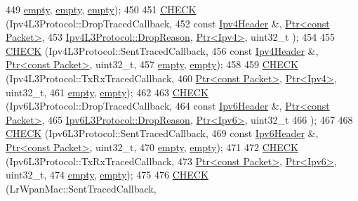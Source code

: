 \begin{DoxyCode}
449          \hyperlink{classns3_1_1empty}{empty}, \hyperlink{classns3_1_1empty}{empty}, \hyperlink{classns3_1_1empty}{empty});
450 
451   \hyperlink{traced-callback-typedef-test-suite_8cc_aa79806eee113005f96d9d3cb1480ce98}{CHECK} (Ipv4L3Protocol::DropTracedCallback,
452          \textcolor{keyword}{const} \hyperlink{classns3_1_1Ipv4Header}{Ipv4Header} &, \hyperlink{classns3_1_1Ptr}{Ptr<const Packet>},
453          \hyperlink{classns3_1_1Ipv4L3Protocol_a05e7403d60c79529257c4cffdd994da1}{Ipv4L3Protocol::DropReason}, \hyperlink{classns3_1_1Ptr}{Ptr<Ipv4>}, uint32\_t );
454 
455   \hyperlink{traced-callback-typedef-test-suite_8cc_aa79806eee113005f96d9d3cb1480ce98}{CHECK} (Ipv4L3Protocol::SentTracedCallback,
456          \textcolor{keyword}{const} \hyperlink{classns3_1_1Ipv4Header}{Ipv4Header} &, \hyperlink{classns3_1_1Ptr}{Ptr<const Packet>}, uint32\_t,
457          \hyperlink{classns3_1_1empty}{empty}, \hyperlink{classns3_1_1empty}{empty});
458 
459   \hyperlink{traced-callback-typedef-test-suite_8cc_aa79806eee113005f96d9d3cb1480ce98}{CHECK} (Ipv4L3Protocol::TxRxTracedCallback,
460          \hyperlink{classns3_1_1Ptr}{Ptr<const Packet>}, \hyperlink{classns3_1_1Ptr}{Ptr<Ipv4>}, uint32\_t,
461          \hyperlink{classns3_1_1empty}{empty}, \hyperlink{classns3_1_1empty}{empty});
462 
463   \hyperlink{traced-callback-typedef-test-suite_8cc_aa79806eee113005f96d9d3cb1480ce98}{CHECK} (Ipv6L3Protocol::DropTracedCallback,
464          \textcolor{keyword}{const} \hyperlink{classns3_1_1Ipv6Header}{Ipv6Header} &, \hyperlink{classns3_1_1Ptr}{Ptr<const Packet>},
465          \hyperlink{classns3_1_1Ipv6L3Protocol_a33c64db9bc35f71ff368b132bfffa37a}{Ipv6L3Protocol::DropReason}, \hyperlink{classns3_1_1Ptr}{Ptr<Ipv6>}, uint32\_t
466          );
467 
468   \hyperlink{traced-callback-typedef-test-suite_8cc_aa79806eee113005f96d9d3cb1480ce98}{CHECK} (Ipv6L3Protocol::SentTracedCallback,
469          \textcolor{keyword}{const} \hyperlink{classns3_1_1Ipv6Header}{Ipv6Header} &, \hyperlink{classns3_1_1Ptr}{Ptr<const Packet>}, uint32\_t,
470          \hyperlink{classns3_1_1empty}{empty}, \hyperlink{classns3_1_1empty}{empty});
471 
472   \hyperlink{traced-callback-typedef-test-suite_8cc_aa79806eee113005f96d9d3cb1480ce98}{CHECK} (Ipv6L3Protocol::TxRxTracedCallback,
473          \hyperlink{classns3_1_1Ptr}{Ptr<const Packet>}, \hyperlink{classns3_1_1Ptr}{Ptr<Ipv6>}, uint32\_t,
474          \hyperlink{classns3_1_1empty}{empty}, \hyperlink{classns3_1_1empty}{empty});
475 
476   \hyperlink{traced-callback-typedef-test-suite_8cc_aa79806eee113005f96d9d3cb1480ce98}{CHECK} (LrWpanMac::SentTracedCallback,

\end{DoxyCode}
